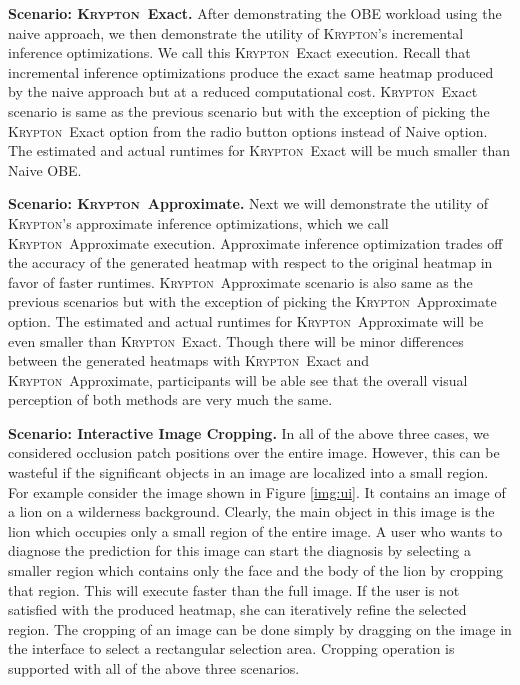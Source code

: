 \documentclass{vldb}
\newcommand{\system}{\textsc{Krypton}}
\begin{document}
\vspace{2mm}
\noindent \textbf{Scenario: \system~Exact.} After demonstrating the OBE workload using the naive approach, we then demonstrate the utility of \system's incremental inference optimizations. We call this \system~Exact execution.
Recall that incremental inference optimizations produce the exact same heatmap produced by the naive approach but at a reduced computational cost.
\system~Exact scenario is same as the previous scenario but with the exception of picking the \system~Exact option from the radio button options instead of Naive option.
The estimated and actual runtimes for \system~Exact will be much smaller than Naive OBE.

\vspace{2mm}
\noindent \textbf{Scenario: \system~Approximate.} Next we will demonstrate the utility of \system's approximate inference optimizations, which we call \system~Approximate execution.
Approximate inference optimization trades off the accuracy of the generated heatmap with respect to the original heatmap in favor of faster runtimes.
\system~Approximate scenario is also same as the previous scenarios but with the exception of picking the \system~Approximate option.
The estimated and actual runtimes for \system~Approximate will be even smaller than \system~Exact.
Though there will be minor differences between the generated heatmaps with \system~Exact and \system~Approximate, participants will be able see that the overall visual perception of both methods are very much the same.

\vspace{2mm}
\noindent \textbf{Scenario: Interactive Image Cropping.} In all of the above three cases, we considered occlusion patch positions over the entire image.
However, this can be wasteful if the significant objects in an image are localized into a small region.
For example consider the image shown in Figure \ref{img:ui}.
It contains an image of a lion on a wilderness background.
Clearly, the main object in this image is the lion which occupies only a small region of the entire image.
A user who wants to diagnose the prediction for this image can start the diagnosis by selecting a smaller region which contains only the face and the body of the lion by cropping that region.
This will execute faster than the full image.
If the user is not satisfied with the produced heatmap, she can iteratively refine the selected region.
The cropping of an image can be done simply by dragging on the image in the interface to select a rectangular selection area.
Cropping operation is supported with all of the above three scenarios.
\end{document}
